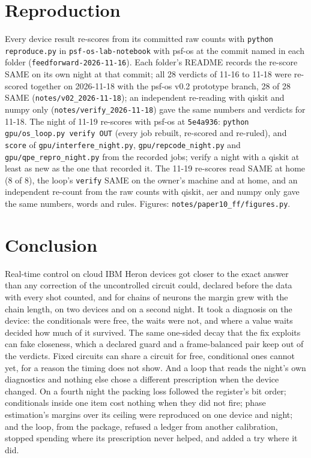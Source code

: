 \documentclass[10pt,a4paper]{article}
\begin{document}
\section{Reproduction}\label{sec:repro}
Every device result re-scores from its committed raw counts with \texttt{python reproduce.py} in
\texttt{psf-os-lab-notebook} with psf-os at the commit named in each folder (\texttt{feedforward-2026-11-16}). Each folder's README records the
re-score SAME on its own night at that commit; all 28 verdicts of 11-16 to 11-18 were re-scored together on 2026-11-18
with the psf-os v0.2 prototype branch, 28 of 28 SAME (\texttt{notes/v02\_2026-11-18}); an independent re-reading with qiskit and numpy only
(\texttt{notes/verify\_2026-11-18}) gave the same numbers and verdicts for 11-18. The night of 11-19 re-scores with
psf-os at \texttt{5e4a936}: \texttt{python gpu/os\_loop.py verify OUT} (every job rebuilt, re-scored and re-ruled), and
\texttt{score} of \texttt{gpu/interfere\_night.py}, \texttt{gpu/repcode\_night.py} and \texttt{gpu/qpe\_repro\_night.py}
from the recorded jobs; verify a night with a qiskit at least as new as the one that recorded it. The 11-19
re-scores read SAME at home (8 of 8), the loop's \texttt{verify} SAME on the owner's machine and at home, and an
independent re-count from the raw counts with qiskit, aer and numpy only gave the same numbers, words and rules. Figures: \texttt{notes/paper10\_ff/figures.py}.

\section{Conclusion}
Real-time control on cloud IBM Heron devices got closer to the exact answer than any correction of the uncontrolled
circuit could, declared before the data with every shot counted, and for chains of neurons the margin grew with the chain
length, on two devices and on a second night. It took a diagnosis on the device: the conditionals were free, the waits
were not, and where a value waits decided how much of it survived. The same one-sided decay that the fix exploits can
fake closeness, which a declared guard and a frame-balanced pair keep out of the verdicts. Fixed circuits can share a
circuit for free, conditional ones cannot yet, for a reason the timing does not show. And a loop that reads the night's
own diagnostics and nothing else chose a different prescription when the device changed. On a fourth night
the packing loss followed the register's bit order; conditionals inside one item cost nothing when they did not fire;
phase estimation's margins over its ceiling were reproduced on one device and night; and the loop, from the package,
refused a ledger from another calibration, stopped spending where its prescription never helped, and added a try where
it did.
\end{document}
